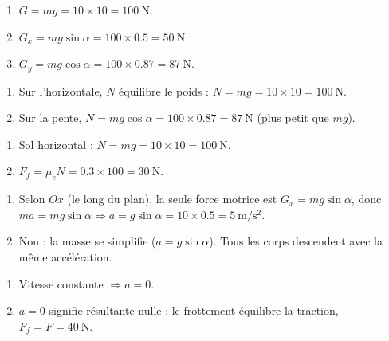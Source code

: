 \documentclass[11pt,a4paper]{article}
\begin{document}

\begin{corrige}
\begin{enumerate}[label=\alph*)]
  \item $G=mg=10\times 10=\qty{100}{\newton}$.
  \item $G_x=mg\sin\alpha=100\times\num{0,5}=\qty{50}{\newton}$.
  \item $G_y=mg\cos\alpha=100\times\num{0,87}=\qty{87}{\newton}$.
\end{enumerate}
\end{corrige}

\begin{corrige}
\begin{enumerate}[label=\alph*)]
  \item Sur l'horizontale, $N$ équilibre le poids : $N=mg=10\times 10=\qty{100}{\newton}$.
  \item Sur la pente, $N=mg\cos\alpha=100\times\num{0,87}=\qty{87}{\newton}$ (plus petit que $mg$).
\end{enumerate}
\end{corrige}

\begin{corrige}
\begin{enumerate}[label=\alph*)]
  \item Sol horizontal : $N=mg=10\times 10=\qty{100}{\newton}$.
  \item $F_f=\mu_c N=\num{0,3}\times 100=\qty{30}{\newton}$.
\end{enumerate}
\end{corrige}

\begin{corrige}
\begin{enumerate}[label=\alph*)]
  \item Selon $Ox$ (le long du plan), la seule force motrice est $G_x=mg\sin\alpha$, donc
        $ma=mg\sin\alpha \Rightarrow a=g\sin\alpha=10\times\num{0,5}=\qty{5}{\metre\per\second\squared}$.
  \item Non : la masse se simplifie ($a=g\sin\alpha$). Tous les corps descendent avec la même accélération.
\end{enumerate}
\end{corrige}

\begin{corrige}
\begin{enumerate}[label=\alph*)]
  \item Vitesse constante $\Rightarrow a=0$.
  \item $a=0$ signifie résultante nulle : le frottement équilibre la traction, $F_f=F=\qty{40}{\newton}$.
\end{enumerate}
\end{corrige}
\end{document}
